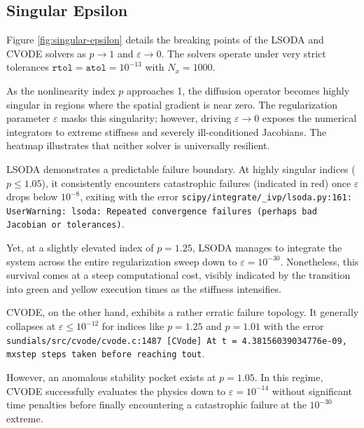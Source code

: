 \subsection{Singular Epsilon}
Figure \ref{fig:singular-epsilon} details the breaking points of the LSODA and CVODE solvers as \(p \to 1\) and \(\varepsilon \to 0\). The solvers operate under very strict tolerances \(\texttt{rtol} = \texttt{atol} = 10^{-13}\) with \(N_x=1000\).

As the nonlinearity index \(p\) approaches 1, the diffusion operator becomes highly singular in regions where the spatial gradient is near zero. The regularization parameter \(\varepsilon\) masks this singularity; however, driving \(\varepsilon \to 0\) exposes the numerical integrators to extreme stiffness and severely ill-conditioned Jacobians. The heatmap illustrates that neither solver is universally resilient.

LSODA demonstrates a predictable failure boundary. At highly singular indices (\(p \leq 1.05\)), it consistently encounters catastrophic failures (indicated in red) once \(\varepsilon\) drops below \(10^{-8}\), exiting with the error \lstinline|scipy/integrate/_ivp/lsoda.py:161: UserWarning: lsoda: Repeated convergence failures (perhaps bad Jacobian or tolerances)|.

Yet, at a slightly elevated index of \(p = 1.25\), LSODA manages to integrate the system across the entire regularization sweep down to \(\varepsilon = 10^{-30}\). Nonetheless, this survival comes at a steep computational cost, visibly indicated by the transition into green and yellow execution times as the stiffness intensifies.

CVODE, on the other hand, exhibits a rather erratic failure topology. It generally collapses at \(\varepsilon \le 10^{-12}\) for indices like \(p = 1.25\) and \(p = 1.01\) with the error \lstinline|sundials/src/cvode/cvode.c:1487 [CVode] At t = 4.38156039034776e-09, mxstep steps taken before reaching tout|.

However, an anomalous stability pocket exists at \(p = 1.05\). In this regime, CVODE successfully evaluates the physics down to \(\varepsilon=10^{-14}\) without significant time penalties before finally encountering a catastrophic failure at the \(10^{-30}\) extreme.

